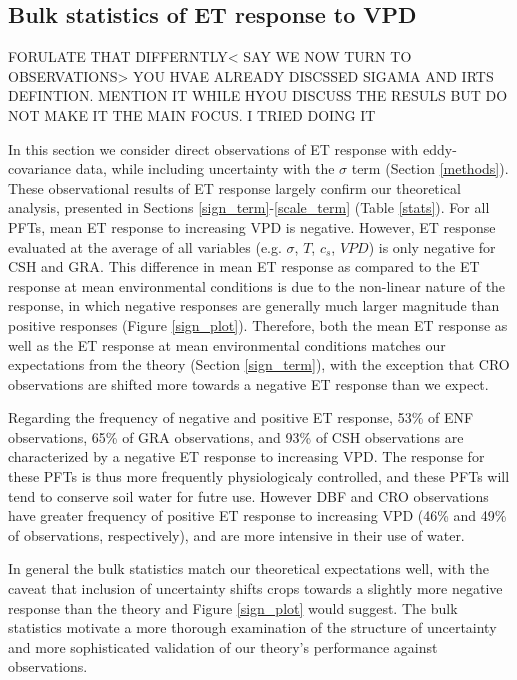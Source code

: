 \documentclass[draft,linenumbers]{gcbjournal}
\begin{document}
\subsection{Bulk statistics of ET response to VPD}
\label{stats_sec}
FORULATE THAT DIFFERNTLY< SAY WE NOW TURN TO OBSERVATIONS> YOU HVAE ALREADY DISCSSED SIGAMA AND IRTS DEFINTION. MENTION IT WHILE HYOU DISCUSS THE RESULS BUT DO NOT MAKE IT THE MAIN FOCUS. I TRIED DOING IT

In this section we consider direct observations of ET response with eddy-covariance data, while including uncertainty with the $\sigma$ term (Section \ref{methods}). These observational results of ET response largely confirm our theoretical analysis, presented in Sections \ref{sign_term}-\ref{scale_term} (Table \ref{stats}). For all PFTs, mean ET response to increasing VPD is negative. However, ET response evaluated at the average of all variables (e.g. $\sigma$, $T$, $c_s$, $VPD$) is only negative for CSH and GRA. This difference in mean ET response as compared to the ET response at mean environmental conditions is due to the non-linear nature of the response, in which negative responses are generally much larger magnitude than positive responses (Figure \ref{sign_plot}). Therefore, both the mean ET response as well as the ET response at mean environmental conditions matches our expectations from the theory (Section \ref{sign_term}), with the exception that CRO observations are shifted more towards a negative ET response than we expect.

Regarding the frequency of negative and positive ET response, 53\% of ENF observations, 65\% of GRA observations, and 93\% of CSH observations are characterized by a negative ET response to increasing VPD. The response for these PFTs is thus more frequently physiologicaly controlled, and these PFTs will tend to conserve soil water for futre use. However DBF and CRO observations have greater frequency of positive ET response to increasing VPD (46\% and 49\% of observations, respectively), and are more intensive in their use of water. 

In general the bulk statistics match our theoretical expectations well, with the caveat that inclusion of uncertainty shifts crops towards a slightly more negative response than the theory and Figure \ref{sign_plot} would suggest. The bulk statistics motivate a more thorough examination of the structure of uncertainty and more sophisticated validation of our theory's performance against observations. 
\end{document}
